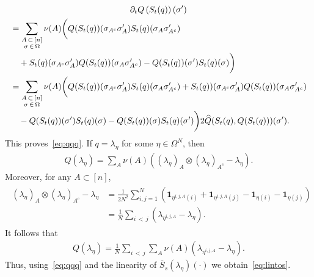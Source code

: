 \documentclass[10pt,a4paper]{article}
\newcommand{\Om}{\Omega}
\newcommand{\ind}{\mathbf{1}}
\let\l=\lambda
\let\O=\Omega
\let\oldhat\hat
\renewcommand*{\hat}[1]{\mathchoice{\widehat{#1}}{\widehat{#1}}{\oldhat{#1}}{\oldhat{#1}}}
\begin{document}
\begin{multline*}
\partial_t Q\left(S_t(q)\right)(\sigma')\\
\begin{aligned}
& = \sum_{\substack{A\,\subset\,[n]\\
\sigma\, \in\,\Om}}\nu(A)\bigg(Q(S_t(q))(\sigma_{A^c} \sigma'_{A}) S_t(q)(\sigma_A \sigma'_{A^c}) \\
&\quad +S_t(q)(\sigma_{A^c} \sigma'_{A})Q(S_t(q))(\sigma_A \sigma'_{A^c}) - Q(S_t(q))(\sigma')S_t(q)(\sigma)\bigg) \\
& = \sum_{\substack{A\,\subset\,[n] \\ \sigma \,\in\,\Om}}\nu(A)\bigg(Q(S_t(q))(\sigma_{A^c} \sigma'_{A}) S_t(q)(\sigma_A \sigma'_{A^c}) +S_t(q))(\sigma_{A^c} \sigma'_{A})Q(S_t(q))(\sigma_A \sigma'_{A^c}) \\
&\quad - Q(S_t(q))(\sigma')S_t(q)(\sigma)-Q(S_t(q))(\sigma)S_t(q)(\sigma')\bigg)
 2\hat{Q}(S_t(q),Q(S_t(q)))(\sigma').
\end{aligned} 
\end{multline*}
This proves~\eqref{eq:qqq}. If $q=\l_{\eta}$ for some $\eta\in\O^N$, then
\begin{align}
Q(\l_{\eta}) = \sum_A\nu(A) \left((\l_{\eta})_A\otimes(\l_{\eta})_{A^c} - \l_{\eta}\right).
\end{align}
Moreover, for any $A\subset [n]$,
\begin{align}
\begin{split}
(\l_{\eta})_A\otimes(\l_{\eta})_{A^c}- \l_{\eta}&= \frac1{2N^2} \sum_{i,j=1}^N\left(\ind_{\eta^{i,j,A}(i)} + \ind_{\eta^{i,j,A}(j)} - \ind_{\eta(i)} - \ind_{\eta(j)}\right)\\
&= \frac1{N} \sum_{i\,<\,j}\left(\l_{\eta^{i,j,A}} - \l_{\eta}\right).
\end{split}
\end{align}
It follows that
\begin{align}
Q(\l_{\eta}) = \frac1{N} \sum_{i\,<\,j}\sum_A\nu(A) (\l_{\eta^{i,j,A}} - \l_{\eta}).
\end{align}
Thus, using~\eqref{eq:qqq} and the linearity of $\bar S_s(\l_\eta)(\cdot)$ we obtain~\eqref{eq:lintos}.
\end{document}

